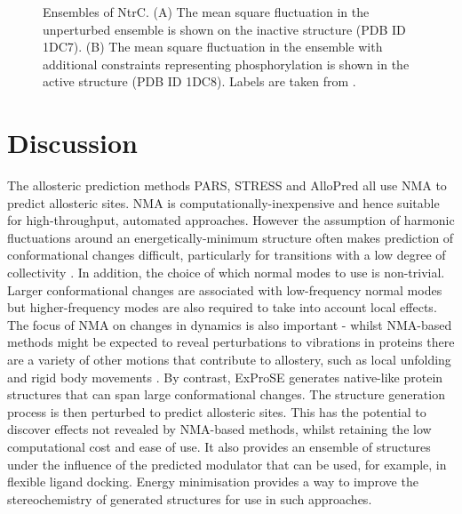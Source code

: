 \begin{figure}
\centering


\caption{Ensembles of NtrC.
(A) The mean square fluctuation in the unperturbed ensemble is shown on the inactive structure (PDB ID 1DC7).
(B) The mean square fluctuation in the ensemble with additional constraints representing phosphorylation is shown in the active structure (PDB ID 1DC8).
Labels are taken from \cite{Volkman2001}.}

\label{fig:ntrc}
\end{figure}


\section{Discussion}

The allosteric prediction methods PARS, STRESS and AlloPred all use NMA to predict allosteric sites.
NMA is computationally-inexpensive and hence suitable for high-throughput, automated approaches.
However the assumption of harmonic fluctuations around an energetically-minimum structure often makes prediction of conformational changes difficult, particularly for transitions with a low degree of collectivity \cite{Yang2007}.
In addition, the choice of which normal modes to use is non-trivial.
Larger conformational changes are associated with low-frequency normal modes but higher-frequency modes are also required to take into account local effects.
The focus of NMA on changes in dynamics is also important - whilst NMA-based methods might be expected to reveal perturbations to vibrations in proteins there are a variety of other motions that contribute to allostery, such as local unfolding and rigid body movements \cite{Motlagh2014}.
By contrast, ExProSE generates native-like protein structures that can span large conformational changes.
The structure generation process is then perturbed to predict allosteric sites.
This has the potential to discover effects not revealed by NMA-based methods, whilst retaining the low computational cost and ease of use.
It also provides an ensemble of structures under the influence of the predicted modulator that can be used, for example, in flexible ligand docking.
Energy minimisation provides a way to improve the stereochemistry of generated structures for use in such approaches.

